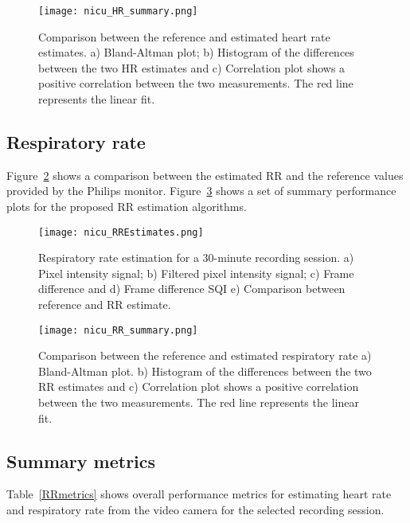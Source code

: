  \begin{center}
\begin{figure}[H]
    \centering
\texttt{[image: nicu\_HR\_summary.png]}
 \caption[Comparison between the reference and estimated heart rate estimates.]{Comparison between the reference and estimated heart rate estimates. a) Bland-Altman plot; b) Histogram of the differences between the two HR estimates and c) Correlation plot shows a positive correlation between the two measurements. The red line represents the linear fit.}
\label{HRsummary}
\end{figure}
\end{center}
 
 \vspace{50em}
 \subsection{Respiratory rate}
Figure~\ref{rrestimates} shows a comparison between the estimated RR and the reference values provided by the Philips monitor. Figure~\ref{RRsummary} shows a set of summary performance plots for the proposed RR estimation algorithms.
  \begin{center}
\begin{figure}[H]
\centering
\texttt{[image: nicu\_RREstimates.png]}
    \caption[Respiratory rate estimation for a 30-minute recording session.]{Respiratory rate estimation for a 30-minute recording session. a) Pixel intensity signal; b) Filtered pixel intensity signal; c) Frame difference and d) Frame difference SQI e) Comparison between reference and RR estimate.}
         \label{rrestimates}
    \end{figure}
 \end{center}
 
 \begin{center}
\begin{figure}[H]
    \centering
\texttt{[image: nicu\_RR\_summary.png]}
 \caption[Comparison between the reference and estimated respiratory rate.]{Comparison between the reference and estimated respiratory rate a) Bland-Altman plot. b) Histogram of the differences between the two RR estimates and c) Correlation plot shows a positive correlation between the two measurements. The red line represents the linear fit.}
     \label{RRsummary}
\end{figure}
\end{center}
 
   \subsection{Summary metrics}
Table~\ref{RRmetrics} shows overall performance metrics for estimating heart rate and respiratory rate from the video camera for the selected recording session.

